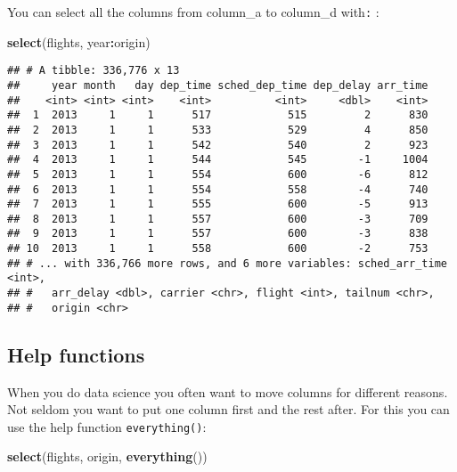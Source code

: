\documentclass[]{book}
\newenvironment{Shaded}{\begin{snugshade}}{\end{snugshade}}
\newcommand{\KeywordTok}[1]{\textcolor[rgb]{0.13,0.29,0.53}{\textbf{#1}}}
\newcommand{\NormalTok}[1]{#1}
\newcommand{\OperatorTok}[1]{\textcolor[rgb]{0.81,0.36,0.00}{\textbf{#1}}}
\begin{document}
You can select all the columns from column\_a to column\_d with\texttt{:} :

\begin{Shaded}
\begin{Highlighting}[]
\KeywordTok{select}\NormalTok{(flights, year}\OperatorTok{:}\NormalTok{origin)}
\end{Highlighting}
\end{Shaded}

\begin{verbatim}
## # A tibble: 336,776 x 13
##     year month   day dep_time sched_dep_time dep_delay arr_time
##    <int> <int> <int>    <int>          <int>     <dbl>    <int>
##  1  2013     1     1      517            515         2      830
##  2  2013     1     1      533            529         4      850
##  3  2013     1     1      542            540         2      923
##  4  2013     1     1      544            545        -1     1004
##  5  2013     1     1      554            600        -6      812
##  6  2013     1     1      554            558        -4      740
##  7  2013     1     1      555            600        -5      913
##  8  2013     1     1      557            600        -3      709
##  9  2013     1     1      557            600        -3      838
## 10  2013     1     1      558            600        -2      753
## # ... with 336,766 more rows, and 6 more variables: sched_arr_time <int>,
## #   arr_delay <dbl>, carrier <chr>, flight <int>, tailnum <chr>,
## #   origin <chr>
\end{verbatim}

\hypertarget{help-functions}{%
\subsection{Help functions}\label{help-functions}}

When you do data science you often want to move columns for different reasons. Not seldom you want to put one column first and the rest after. For this you can use the help function \texttt{everything()}:

\begin{Shaded}
\begin{Highlighting}[]
\KeywordTok{select}\NormalTok{(flights, origin, }\KeywordTok{everything}\NormalTok{())}
\end{Highlighting}
\end{Shaded}
\end{document}
